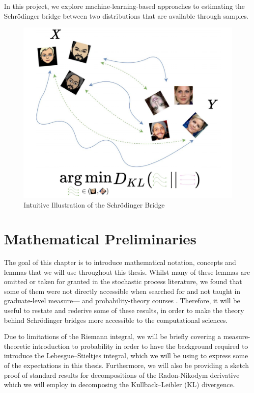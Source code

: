 \documentclass[a4paper,12pt,twoside,openright]{report}
\theoremstyle{definition}
\begin{document}
 In this project, we explore machine-learning-based approaches to estimating the Schrödinger bridge between two distributions that are available through samples.
\begin{figure}
    \centering
    \includegraphics[scale=0.7]{images/charicaturistic_bridge.PNG}
    \caption{Intuitive Illustration of the Schrödinger Bridge}
    \label{fig:intuitive_bridge}
\end{figure}

 
\chapter{Mathematical Preliminaries}


The goal of this chapter is to introduce mathematical notation, concepts and lemmas that we will use throughout this thesis. Whilst many of these lemmas are omitted or taken for granted in the stochastic process literature, we found that some of them were not directly accessible when searched for and not taught in graduate-level measure--- and probability-theory courses \citep{ethmeasure,mitmeasure,cambprob}. Therefore, it will be useful to restate and rederive some of these results, in order to make the theory behind Schrödinger bridges more accessible to the computational sciences.

Due to limitations of the Riemann integral, we will be briefly covering a measure-theoretic introduction to probability in order to have the background required to introduce the  Lebesgue–Stieltjes integral, which we will be using to express some of the expectations in this thesis. Furthermore, we will also be providing a sketch proof of standard results for decompositions of the Radon-Nikodym derivative which we will employ in decomposing the Kullback–Leibler (KL) divergence. 
\end{document}
